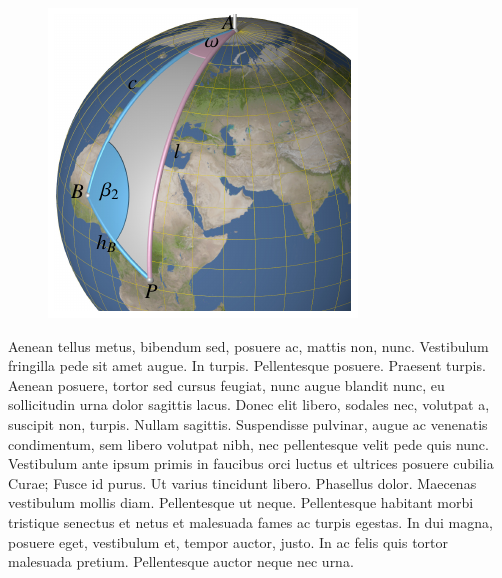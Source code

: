 \documentclass[12pt]{article}
\begin{document}
\begin{figure}
\includegraphics{position4-small.pdf}
\end{figure}
Aenean tellus metus, bibendum sed, posuere ac, mattis non, nunc.
Vestibulum fringilla pede sit amet augue. In turpis. Pellentesque
posuere. Praesent turpis. Aenean posuere, tortor sed cursus feugiat,
nunc augue blandit nunc, eu sollicitudin urna dolor sagittis lacus.
Donec elit libero, sodales nec, volutpat a, suscipit non, turpis.
Nullam sagittis. Suspendisse pulvinar, augue ac venenatis condimentum,
sem libero volutpat nibh, nec pellentesque velit pede quis nunc.
Vestibulum ante ipsum primis in faucibus orci luctus et ultrices
posuere cubilia Curae; Fusce id purus. Ut varius tincidunt libero.
Phasellus dolor. Maecenas vestibulum mollis diam. Pellentesque ut
neque. Pellentesque habitant morbi tristique senectus et netus et
malesuada fames ac turpis egestas. In dui magna, posuere eget,
vestibulum et, tempor auctor, justo. In ac felis quis tortor malesuada
pretium. Pellentesque auctor neque nec urna.

\pagebreak
\end{document}

